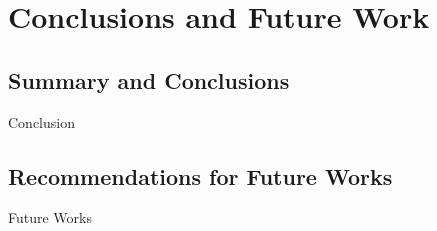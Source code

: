 \newpage
\chapter{Conclusions and Future Work}

\section{Summary and Conclusions}
Conclusion

\section{Recommendations for Future Works}
Future Works